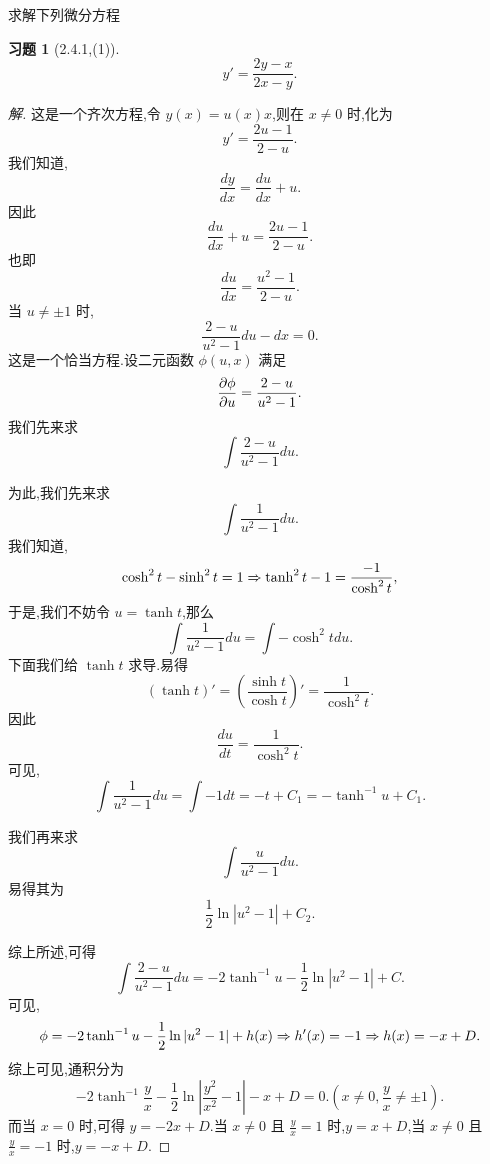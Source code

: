 \documentclass[a4paper, 12pt]{article} %
\newtheorem*{cdtheorem}{习题}
\newenvironment{exercise}
{\bigskip\begin{mdframed}[backgroundcolor=gray!40,rightline=false,leftline=false,topline=false,bottomline=false]\begin{cdtheorem}}
    {\end{cdtheorem}\end{mdframed}\bigskip}
\begin{document}
\begin{CJK}{UTF8}{gkai}
  求解下列微分方程
  \begin{exercise}[2.4.1,(1)]
$$
y'=\frac{2y-x}{2x-y}.
$$
\end{exercise}
\begin{proof}[解]
  这是一个齐次方程,令 $y(x)=u(x)x$,则在 $x\neq 0$ 时,化为
$$
y'=\frac{2u-1}{2-u}.
$$
我们知道,
$$
\frac{dy}{dx}=\frac{du}{dx}+u.
$$
因此
$$
\frac{du}{dx}+u=\frac{2u-1}{2-u}.
$$
也即
$$
\frac{du}{dx}=\frac{u^2-1}{2-u}.
$$
当 $u\neq \pm 1$ 时,
$$
\frac{2-u}{u^2-1}du-dx=0.
$$
这是一个恰当方程.设二元函数 $\phi(u,x)$ 满足
$$
\frac{\partial\phi}{\partial u}=\frac{2-u}{u^2-1}.
$$
我们先来求
$$
\int \frac{2-u}{u^2-1}du.
$$
\begin{shaded}
为此,我们先来求
$$
\int \frac{1}{u^2-1}du.
$$
我们知道,
$$
\cosh^2t-\sinh^2t=1\Rightarrow \tanh^2t-1=\frac{-1}{\cosh^2t},
$$
于是,我们不妨令 $u=\tanh t$,那么
$$
\int \frac{1}{u^2-1}du=\int -\cosh^2tdu.
$$
下面我们给 $\tanh t$ 求导.易得
$$
(\tanh t)'=(\frac{\sinh t}{\cosh t})'=\frac{1}{\cosh^2 t}.
$$
因此
$$
\frac{du}{dt}=\frac{1}{\cosh^2t}.
$$
可见,
$$
\int \frac{1}{u^2-1}du=\int -1dt=-t+C_1=-\tanh^{-1}u+C_1.
$$
\end{shaded}
\begin{shaded}
  我们再来求
$$
\int \frac{u}{u^2-1}du.
$$
易得其为
$$
\frac{1}{2}\ln |u^2-1|+C_2.
$$
\end{shaded}
综上所述,可得
$$
\int \frac{2-u}{u^2-1}du=-2\tanh^{-1}u-\frac{1}{2}\ln|u^2-1|+C.
$$
可见,
$$
\phi=-2\tanh^{-1}u-\frac{1}{2}\ln|u^2-1|+h(x)\Rightarrow h'(x)=-1\Rightarrow h(x)=-x+D.
$$
综上可见,通积分为
$$
-2\tanh^{-1}\frac{y}{x}-\frac{1}{2}\ln|\frac{y^2}{x^2}-1|-x+D=0.(x\neq
0,\frac{y}{x}\neq \pm 1).
$$
而当 $x=0$ 时,可得 $y=-2x+D$.当 $x\neq 0$ 且 $\frac{y}{x}= 1$
时,$y=x+D$,当 $x\neq 0$ 且 $\frac{y}{x}=-1$ 时,$y=-x+D$.
\end{proof}
  

  

  
\end{CJK}
\end{document}
